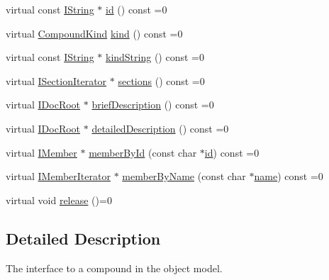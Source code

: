 \begin{DoxyCompactItemize}
\item 
virtual const \mbox{\hyperlink{class_i_string}{I\+String}} $\ast$ \mbox{\hyperlink{class_i_compound_ac5c371dee7e65324518532b0a58c2d9f}{id}} () const =0
\item 
virtual \mbox{\hyperlink{class_i_compound_a6b86be2ca9f6759434c1dd8405be328a}{Compound\+Kind}} \mbox{\hyperlink{class_i_compound_ad0d6fb22a48b5bbddae2b88a3cab3640}{kind}} () const =0
\item 
virtual const \mbox{\hyperlink{class_i_string}{I\+String}} $\ast$ \mbox{\hyperlink{class_i_compound_a49a7cb96ed8364494bdb7ecc1abb86c9}{kind\+String}} () const =0
\item 
virtual \mbox{\hyperlink{class_i_section_iterator}{I\+Section\+Iterator}} $\ast$ \mbox{\hyperlink{class_i_compound_a966a7cac6a4f33f16ef869e74855ab3b}{sections}} () const =0
\item 
virtual \mbox{\hyperlink{class_i_doc_root}{I\+Doc\+Root}} $\ast$ \mbox{\hyperlink{class_i_compound_a1ac3073130ef6bdd552c275e488c0658}{brief\+Description}} () const =0
\item 
virtual \mbox{\hyperlink{class_i_doc_root}{I\+Doc\+Root}} $\ast$ \mbox{\hyperlink{class_i_compound_a9630b083767887a40040cb4408d538cd}{detailed\+Description}} () const =0
\item 
virtual \mbox{\hyperlink{class_i_member}{I\+Member}} $\ast$ \mbox{\hyperlink{class_i_compound_af30652d3b5a43722e9407c8edf9a38fb}{member\+By\+Id}} (const char $\ast$\mbox{\hyperlink{class_i_compound_ac5c371dee7e65324518532b0a58c2d9f}{id}}) const =0
\item 
virtual \mbox{\hyperlink{class_i_member_iterator}{I\+Member\+Iterator}} $\ast$ \mbox{\hyperlink{class_i_compound_af94f0805a794ec5f413c9e16347e2591}{member\+By\+Name}} (const char $\ast$\mbox{\hyperlink{class_i_compound_ae14b5dcf513ef0d263119aeb2e2ffb15}{name}}) const =0
\item 
virtual void \mbox{\hyperlink{class_i_compound_a5388c74d390323ce610f752a01456b21}{release}} ()=0
\end{DoxyCompactItemize}


\subsection{Detailed Description}
The interface to a compound in the object model. 

